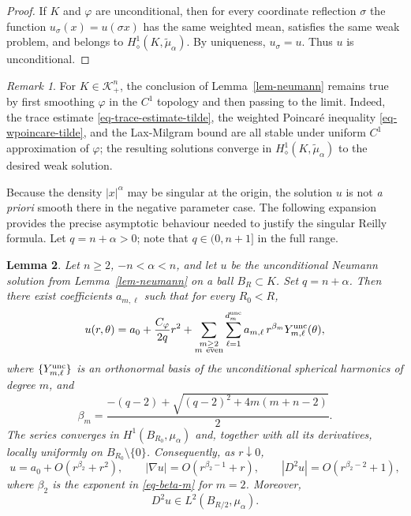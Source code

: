 \documentclass[12pt,leqno]{amsart}
\theoremstyle{plain} \newtheorem{thm}{Theorem}[section]
\theoremstyle{plain} \newtheorem{prop}[thm]{Proposition}
\theoremstyle{plain} \newtheorem{prob}[thm]{Problem}
\theoremstyle{definition} \newtheorem{defi}[thm]{Definition}
\theoremstyle{plain} \newtheorem{cor}[thm]{Corollary}
\theoremstyle{plain} \newtheorem{lem}[thm]{Lemma}
\theoremstyle{plain} \newtheorem{eg}{Example}[section]
\theoremstyle{remark} \newtheorem{rmk}[thm]{Remark}
\theoremstyle{plain} \newtheorem{conj}{Conjecture}
\numberwithin{equation}{section}
\begin{document}
\begin{proof}
  If $K$ and $\varphi$ are unconditional, then for every coordinate
  reflection $\sigma$ the function $u_\sigma(x)=u(\sigma x)$ has the
  same weighted mean, satisfies the same weak problem, and belongs to
  $H^1_\diamond(K,\tilde{\mu}_\alpha)$. By uniqueness,
  $u_\sigma=u$. Thus $u$ is unconditional.
\end{proof}

\begin{rmk}
  For $K\in\mathcal{K}_{+}^n$, the conclusion of Lemma~\ref{lem-neumann} remains true by first smoothing $\varphi$ in the $C^1$ topology and then passing to the limit. 
  Indeed, the trace estimate \eqref{eq-trace-estimate-tilde},
  the weighted Poincar\'e inequality \eqref{eq-wpoincare-tilde}, and
  the Lax-Milgram bound are all stable under uniform $C^1$
  approximation of $\varphi$; the resulting solutions converge in
  $H^1_\diamond(K,\tilde{\mu}_\alpha)$ to the desired weak solution.
\end{rmk}


Because the density $|x|^\alpha$ may be singular at the origin,
the solution $u$ is not \emph{a priori} smooth there in the negative
parameter case. The following expansion provides the precise asymptotic
behaviour needed to justify the singular Reilly formula. Let
$q=n+\alpha>0$; note that $q\in(0,n+1]$ in the full range.

\begin{lem}\label{lem-expansion} 
  Let $n\ge2$, $-n<\alpha<n$, and let $u$ be the unconditional Neumann
  solution from Lemma~\ref{lem-neumann} on a ball $B_R\subset K$.
  Set $q=n+\alpha$. Then there exist coefficients $a_{m,\ell}$ such that for every
  $R_0<R$,
  \begin{equation}\label{eq-expansion}
    u(r,\theta)
    =a_0+\frac{C_\varphi}{2q}r^2
     +\sum_{\substack{m\ge2\\m\ \text{even}}}
       \sum_{\ell=1}^{d_m^{\rm unc}} a_{m,\ell}\,
       r^{\beta_m}Y_{m,\ell}^{\rm unc}(\theta),
  \end{equation}
  where $\{Y_{m,\ell}^{\rm unc}\}$ is an orthonormal basis of the
  unconditional spherical harmonics of degree $m$, and
  \begin{equation}\label{eq-beta-m}
    \beta_m
    =\frac{-(q-2)+\sqrt{(q-2)^2+4m(m+n-2)}}{2}.
  \end{equation}
  The series converges in $H^1(B_{R_0},\mu_\alpha)$ and, together with
  all its derivatives, locally uniformly on $B_{R_0}\setminus\{0\}$.
  Consequently, as $r\downarrow0$,
  \begin{equation}\label{eq-asymptotics}
    u=a_0+O(r^{\beta_2}+r^2),\qquad
    |\nabla u|=O(r^{\beta_2-1}+r),\qquad
    |D^2u|=O(r^{\beta_2-2}+1),
  \end{equation}
  where $\beta_2$ is the exponent in \eqref{eq-beta-m} for $m=2$.
  Moreover,
  \begin{equation}\label{eq-hessian-l2}
    D^2u\in L^2(B_{R/2},\mu_\alpha).
  \end{equation}
\end{lem}
\end{document}
